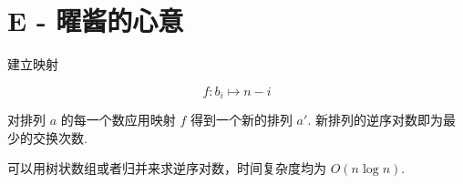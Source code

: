 \documentclass{ctexart}
\begin{document}
\section*{E - 曜酱的心意}

建立映射

\[
    f: b_i \mapsto n-i
\]

对排列 $a$ 的每一个数应用映射 $f$ 得到一个新的排列 $a'$.
新排列的逆序对数即为最少的交换次数.

可以用树状数组或者归并来求逆序对数，时间复杂度均为 $O(n\log{n})$.
\end{document}
